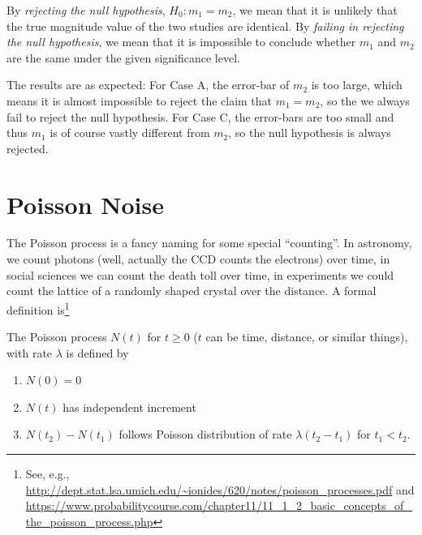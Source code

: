By \textit{rejecting the null hypothesis}, $ H_0: m_1 = m_2 $, we mean that it is unlikely that the true magnitude value of the two studies are identical. By \textit{failing in rejecting the null hypothesis}, we mean that it is impossible to conclude whether $ m_1 $ and $ m_2 $ are the same under the given significance level. 

The results are as expected: For Case A, the error-bar of $ m_2 $ is too large, which means it is almost impossible to reject the claim that $ m_1 = m_2 $, so the we always fail to reject the null hypothesis. For Case C, the error-bars are too small and thus $ m_1 $ is of course vastly different from $ m_2 $, so the null hypothesis is always rejected.





\section{Poisson Noise}
The Poisson process is a fancy naming for some special ``counting''. In astronomy, we count photons (well, actually the CCD counts the electrons) over time, in social sciences we can count the death toll over time, in experiments we could count the lattice of a randomly shaped crystal over the distance. A formal definition is\footnote{See, e.g., \url{http://dept.stat.lsa.umich.edu/~ionides/620/notes/poisson_processes.pdf} and \url{https://www.probabilitycourse.com/chapter11/11_1_2_basic_concepts_of_the_poisson_process.php}}

\begin{defn}
The Poisson process $ N(t) $ for $ t \ge 0 $ ($ t $ can be time, distance, or similar things), with rate $ \lambda $ is defined by
\begin{enumerate}
\item $ N(0) = 0 $
\item $ N(t) $ has independent increment
\item $ N(t_2) - N(t_1) $ follows Poisson distribution of rate $ \lambda (t_2 - t_1) $ for $ t_1 < t_2 $.
\end{enumerate}
\end{defn}

